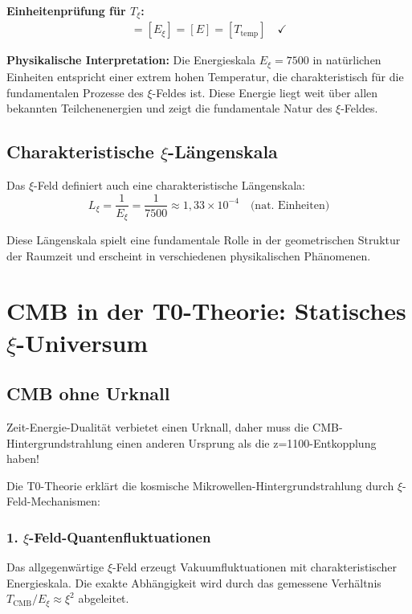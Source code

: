 \documentclass[12pt,a4paper]{article}
\theoremstyle{definition}
\theoremstyle{remark}
\begin{document}
	\textbf{Einheitenpr\"ufung f\"ur $T_\xi$:}
	\begin{align}
		[T_\xi] = [E_\xi] = [E] = [T_{\text{temp}}] \quad \checkmark
	\end{align}
	
	\textbf{Physikalische Interpretation:} Die Energieskala $E_\xi = 7500$ in nat\"urlichen Einheiten entspricht einer extrem hohen Temperatur, die charakteristisch f\"ur die fundamentalen Prozesse des $\xi$-Feldes ist. Diese Energie liegt weit \"uber allen bekannten Teilchenenergien und zeigt die fundamentale Natur des $\xi$-Feldes.
	
	\subsection{Charakteristische $\xi$-L\"angenskala}
	
	Das $\xi$-Feld definiert auch eine charakteristische L\"angenskala:
	\begin{equation}
		L_\xi = \frac{1}{E_\xi} = \frac{1}{7500} \approx 1,33 \times 10^{-4} \quad \text{(nat. Einheiten)}
	\end{equation}
	
	Diese L\"angenskala spielt eine fundamentale Rolle in der geometrischen Struktur der Raumzeit und erscheint in verschiedenen physikalischen Ph\"anomenen.
	
	\section{CMB in der T0-Theorie: Statisches $\xi$-Universum}
	
	\subsection{CMB ohne Urknall}
	
	\begin{revolutionary}
		Zeit-Energie-Dualit\"at verbietet einen Urknall, daher muss die CMB-Hintergrundstrahlung einen anderen Ursprung als die z=1100-Entkopplung haben!
	\end{revolutionary}
	
	Die T0-Theorie erkl\"art die kosmische Mikrowellen-Hintergrundstrahlung durch $\xi$-Feld-Mechanismen:
	
	\subsubsection{1. $\xi$-Feld-Quantenfluktuationen}
	Das allgegenw\"artige $\xi$-Feld erzeugt Vakuumfluktuationen mit charakteristischer Energieskala. Die exakte Abh\"angigkeit wird durch das gemessene Verh\"altnis $T_{\text{CMB}}/E_\xi \approx \xi^2$ abgeleitet.
	
\end{document}
